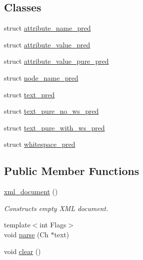 \subsection*{Classes}
\begin{DoxyCompactItemize}
\item 
struct \hyperlink{structrapidxml_1_1xml__document_1_1attribute__name__pred}{attribute\+\_\+name\+\_\+pred}
\item 
struct \hyperlink{structrapidxml_1_1xml__document_1_1attribute__value__pred}{attribute\+\_\+value\+\_\+pred}
\item 
struct \hyperlink{structrapidxml_1_1xml__document_1_1attribute__value__pure__pred}{attribute\+\_\+value\+\_\+pure\+\_\+pred}
\item 
struct \hyperlink{structrapidxml_1_1xml__document_1_1node__name__pred}{node\+\_\+name\+\_\+pred}
\item 
struct \hyperlink{structrapidxml_1_1xml__document_1_1text__pred}{text\+\_\+pred}
\item 
struct \hyperlink{structrapidxml_1_1xml__document_1_1text__pure__no__ws__pred}{text\+\_\+pure\+\_\+no\+\_\+ws\+\_\+pred}
\item 
struct \hyperlink{structrapidxml_1_1xml__document_1_1text__pure__with__ws__pred}{text\+\_\+pure\+\_\+with\+\_\+ws\+\_\+pred}
\item 
struct \hyperlink{structrapidxml_1_1xml__document_1_1whitespace__pred}{whitespace\+\_\+pred}
\end{DoxyCompactItemize}
\subsection*{Public Member Functions}
\begin{DoxyCompactItemize}
\item 
\hyperlink{singletonrapidxml_1_1xml__document_aae8841b15085ba8f32ff46587ace28f5}{xml\+\_\+document} ()
\begin{DoxyCompactList}\small\item\em Constructs empty X\+M\+L document. \end{DoxyCompactList}\item 
{\footnotesize template$<$int Flags$>$ }\\void \hyperlink{singletonrapidxml_1_1xml__document_ac6e73ff9ac323bf5a370c38feb03a6b1}{parse} (Ch $\ast$text)
\item 
void \hyperlink{singletonrapidxml_1_1xml__document_a826929ff54242532198701f19ff5f83f}{clear} ()
\end{DoxyCompactItemize}

